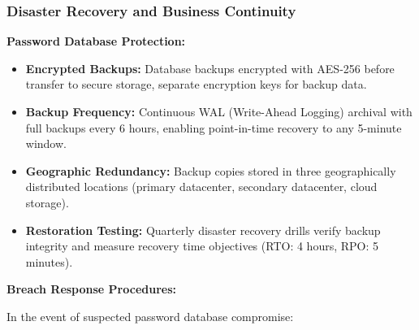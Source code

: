 \documentclass[12pt,a4paper]{article}
\begin{document}
\subsubsection{Disaster Recovery and Business Continuity}

\textbf{Password Database Protection:}

\begin{itemize}[leftmargin=2em, itemsep=6pt]
    \item \textbf{Encrypted Backups:} Database backups encrypted with AES-256 before transfer to secure storage, separate encryption keys for backup data.
    \item \textbf{Backup Frequency:} Continuous WAL (Write-Ahead Logging) archival with full backups every 6 hours, enabling point-in-time recovery to any 5-minute window.
    \item \textbf{Geographic Redundancy:} Backup copies stored in three geographically distributed locations (primary datacenter, secondary datacenter, cloud storage).
    \item \textbf{Restoration Testing:} Quarterly disaster recovery drills verify backup integrity and measure recovery time objectives (RTO: 4 hours, RPO: 5 minutes).
\end{itemize}

\vspace{0.5em}

\textbf{Breach Response Procedures:}

In the event of suspected password database compromise:
\end{document}
